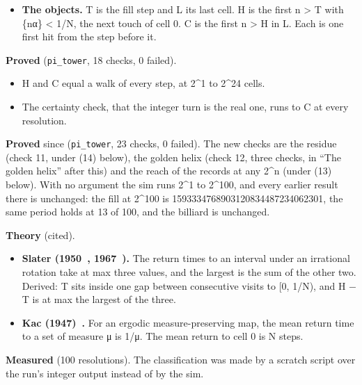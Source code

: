 \begin{itemize}
\item \textbf{The objects.} T is the fill step and L its last cell. H is the first n > T with \{nα\} < 1/N, the next touch of cell 0. C is the first n > H in L. Each is one first hit from the step before it.
\end{itemize}

\textbf{Proved} (\texttt{pi\_\allowbreak{}tower}, 18 checks, 0 failed).

\begin{itemize}
\item H and C equal a walk of every step, at 2\textasciicircum{}1 to 2\textasciicircum{}24 cells.
\item The certainty check, that the integer turn is the real one, runs to C at every resolution.
\end{itemize}

\textbf{Proved} since (\texttt{pi\_\allowbreak{}tower}, 23 checks, 0 failed). The new checks are the residue (check 11, under (14) below), the golden helix (check 12, three checks, in “The golden helix” after this) and the reach of the records at any 2\textasciicircum{}n (under (13) below). With no argument the sim runs 2\textasciicircum{}1 to 2\textasciicircum{}100, and every earlier result there is unchanged: the fill at 2\textasciicircum{}100 is 1593334768903120834487234062301, the same period holds at 13 of 100, and the billiard is unchanged.

\textbf{Theory} (cited).

\begin{itemize}
\item \textbf{Slater (1950~\cite{src:Slater-1950}, 1967~\cite{src:Slater-1967}).} The return times to an interval under an irrational rotation take at max three values, and the largest is the sum of the other two. Derived: T sits inside one gap between consecutive visits to [0, 1/N), and H − T is at max the largest of the three.
\item \textbf{Kac (1947)~\cite{src:Kac}.} For an ergodic measure-preserving map, the mean return time to a set of measure μ is 1/μ. The mean return to cell 0 is N steps.
\end{itemize}

\textbf{Measured} (100 resolutions). The classification was made by a scratch script over the run's integer output instead of by the sim.

